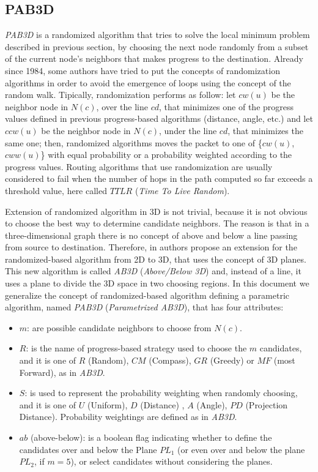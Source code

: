 \documentclass[journal,comsoc]{IEEEtran}
\begin{document}
\subsection{PAB3D}
\emph{PAB3D} is a randomized algorithm that tries to solve the local minimum problem described in previous section, by choosing the next node randomly from a subset of the current node's neighbors that makes progress to the destination. Already since 1984, some authors have tried to put the concepts of randomization algorithms in order to avoid the emergence of loops \cite{nelson:random, bose:compass, fevens:abface} using the concept of the random walk. Tipically, randomization performs as follow: let \(cw(u)\) be the neighbor node in \(N(c)\), over the line \(cd\), that minimizes one of the progress values defined in previous progress-based algorithms (distance, angle, etc.) and let \(ccw(u)\) be the neighbor node in \(N(c)\), under the line \(cd\), that minimizes the same one; then, randomized algorithms moves the packet to one of \{\(cw(u)\), \(cww(u)\)\} with equal probability or a probability weighted according to the progress values. Routing algorithms that use randomization are usually considered to fail when the number of hops in the path computed so far exceeds a threshold value, here called \(TTLR\) (\emph{Time To Live Random}).
\par Extension of randomized algorithm in 3D is not trivial, because it is not obvious to choose the best way to determine candidate neighbors. The reason is that in a three-dimensional graph there is no concept of above and below a line passing from source to destination. Therefore, in \cite{abdallah:random} authors propose an extension for the randomized-based algorithm from 2D to 3D, that uses the concept of 3D planes. This new algorithm is called \emph{AB3D} (\emph{Above/Below 3D}) and, instead of a line, it uses a plane to divide the 3D space in two choosing regions. In this document we generalize the concept of randomized-based algorithm defining a parametric algorithm, named \emph{PAB3D} (\emph{Parametrized AB3D}), that has four attributes:
\begin{itemize}
\item \(m\): are possible candidate neighbors to choose from \(N(c)\).
\item \(R\): is the name of progress-based strategy used to choose the \(m\) candidates, and it is one of \(R\) (Random), \(CM\) (Compass), \(GR\) (Greedy) or \(MF\) (most Forward), as in \emph{AB3D}.
\item \(S\): is used to represent the probability weighting when randomly choosing, and it is one of \(U\) (Uniform), \(D\) (Distance) , \(A\) (Angle), \(PD\) (Projection Distance). Probability weightings are defined as in \emph{AB3D}.
\item \(ab\) (above-below): is a boolean flag indicating whether to define the candidates over and below the Plane \(PL_1\) (or even over and below the plane \(PL_2\), if \(m = 5\)), or select candidates without considering the planes.
\end{itemize}
\end{document}
